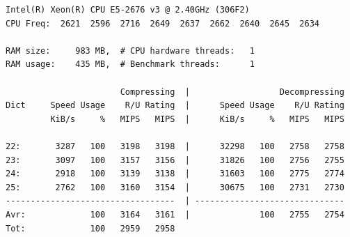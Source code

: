 \documentclass[a4paper,openright,12pt]{article}
\begin{document}
\begin{appendices}
\begin{verbatim}
Intel(R) Xeon(R) CPU E5-2676 v3 @ 2.40GHz (306F2)
CPU Freq:  2621  2596  2716  2649  2637  2662  2640  2645  2634

RAM size:     983 MB,  # CPU hardware threads:   1
RAM usage:    435 MB,  # Benchmark threads:      1

                       Compressing  |                  Decompressing
Dict     Speed Usage    R/U Rating  |      Speed Usage    R/U Rating
         KiB/s     %   MIPS   MIPS  |      KiB/s     %   MIPS   MIPS

22:       3287   100   3198   3198  |      32298   100   2758   2758
23:       3097   100   3157   3156  |      31826   100   2756   2755
24:       2918   100   3139   3138  |      31603   100   2775   2774
25:       2762   100   3160   3154  |      30675   100   2731   2730
----------------------------------  | ------------------------------
Avr:             100   3164   3161  |              100   2755   2754
Tot:             100   2959   2958
\end{verbatim}

\end{appendices}
\end{document}
